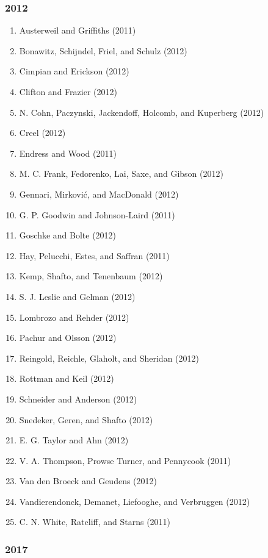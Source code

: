 \documentclass[english,man]{apa6}
\providecommand{\tightlist}{%
  \setlength{\itemsep}{0pt}\setlength{\parskip}{0pt}}
\theoremstyle{definition}
\theoremstyle{definition}
\theoremstyle{definition}
\theoremstyle{remark}
\begin{document}
\subsubsection{2012}\label{section-4}

\begin{enumerate}
\def\labelenumi{\arabic{enumi})}
\tightlist
\item
  Austerweil and Griffiths (2011)
\item
  Bonawitz, Schijndel, Friel, and Schulz (2012)
\item
  Cimpian and Erickson (2012)
\item
  Clifton and Frazier (2012)
\item
  N. Cohn, Paczynski, Jackendoff, Holcomb, and Kuperberg (2012)
\item
  Creel (2012)
\item
  Endress and Wood (2011)
\item
  M. C. Frank, Fedorenko, Lai, Saxe, and Gibson (2012)
\item
  Gennari, Mirković, and MacDonald (2012)
\item
  G. P. Goodwin and Johnson-Laird (2011)
\item
  Goschke and Bolte (2012)
\item
  Hay, Pelucchi, Estes, and Saffran (2011)
\item
  Kemp, Shafto, and Tenenbaum (2012)
\item
  S. J. Leslie and Gelman (2012)
\item
  Lombrozo and Rehder (2012)
\item
  Pachur and Olsson (2012)
\item
  Reingold, Reichle, Glaholt, and Sheridan (2012)
\item
  Rottman and Keil (2012)
\item
  Schneider and Anderson (2012)
\item
  Snedeker, Geren, and Shafto (2012)
\item
  E. G. Taylor and Ahn (2012)
\item
  V. A. Thompson, Prowse Turner, and Pennycook (2011)
\item
  Van den Broeck and Geudens (2012)
\item
  Vandierendonck, Demanet, Liefooghe, and Verbruggen (2012)
\item
  C. N. White, Ratcliff, and Starns (2011)
\end{enumerate}

\subsubsection{2017}\label{section-5}
\end{document}
